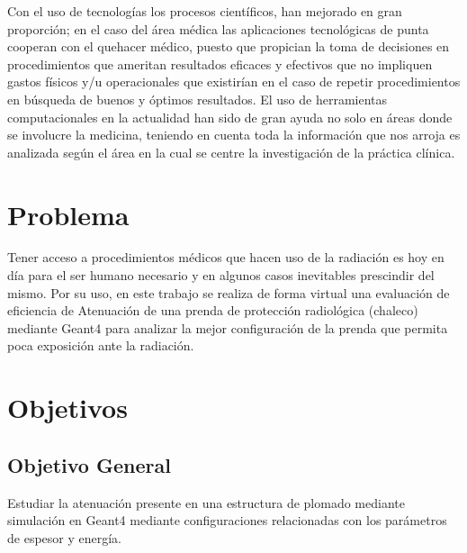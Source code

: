 \documentclass[a4paper,10pt]{article}
\begin{document}
Con el uso de tecnologías los procesos científicos, han mejorado en gran proporción; en el caso del área médica las aplicaciones tecnológicas de punta cooperan con el quehacer médico, puesto que  propician la toma de decisiones en procedimientos que ameritan resultados eficaces y efectivos que no impliquen gastos físicos y/u operacionales que existirían en el caso de repetir procedimientos en búsqueda de buenos y óptimos resultados. El uso de herramientas computacionales en la actualidad  han sido de gran ayuda no solo en áreas donde se involucre la medicina, teniendo en cuenta toda la información que nos arroja es analizada según el área en la cual se centre la investigación de la  práctica clínica.


\section{Problema}

Tener acceso a procedimientos médicos que hacen uso de la radiación es hoy en día para el ser humano necesario y  en algunos casos inevitables prescindir del mismo. Por su uso, en este trabajo se realiza de forma virtual una  evaluación de eficiencia de Atenuación de una prenda de protección radiológica (chaleco) mediante Geant4 para analizar la mejor configuración de la prenda que permita poca exposición ante la radiación.


\section{Objetivos}
\subsection{Objetivo General}
Estudiar la atenuación presente en una estructura de plomado mediante simulación en Geant4 mediante configuraciones relacionadas con los parámetros de espesor y energía.
\end{document}
